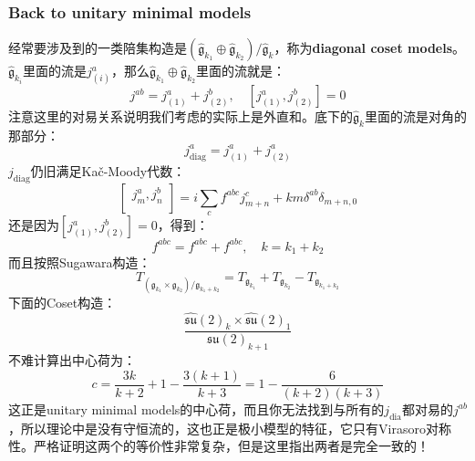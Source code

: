 \subsubsection{Back to unitary minimal models}
经常要涉及到的一类陪集构造是$(\hat{\mathfrak{g}}_{k_1}\oplus\hat{\mathfrak{g}}_{k_2})/\hat{\mathfrak{g}}_k$，称为\textbf{diagonal coset models}。$\hat{\mathfrak{g}}_{k_i}$里面的流是$j^a_{(i)}$，那么$\hat{\mathfrak{g}}_{k_1}\oplus\hat{\mathfrak{g}}_{k_2}$里面的流就是：
\begin{equation}
	j^{ab}=j_{(1)}^a+j_{(2)}^b,\quad [j_{(1)}^a,j_{(2)}^b]=0
\end{equation}
注意这里的对易关系说明我们考虑的实际上是外直和。底下的$\hat{\mathfrak{g}}_k$里面的流是对角的那部分：
\begin{equation}
	j_{\mathrm{diag}}^a=j_{(1)}^a+j_{(2)}^a
\end{equation}
$j_{\mathrm{diag}}$仍旧满足Ka\v{c}-Moody代数：
\begin{equation}
	\left.\left[\begin{array}{c}j_m^a,j_n^b\\\end{array}\right.\right]=i\sum_cf^{abc}j_{m+n}^c+km\delta^{ab}\delta_{m+n,0}
\end{equation}
还是因为$[j_{(1)}^a,j_{(2)}^b]=0$，得到：
\begin{equation}
	f^{abc}=f^{abc}+f^{abc},\quad k=k_1+k_2
\end{equation}
而且按照Sugawara构造：
\begin{equation}
	T_{(\mathfrak{g}_{k_1}\times\mathfrak{g}_{k_2})/\mathfrak{g}_{k_1+k_2}}=T_{\mathfrak{g}_{k_1}}+T_{\mathfrak{g}_{k_2}}-T_{\mathfrak{g}_{k_1+k_2}}
\end{equation}
下面的Coset构造：
\begin{equation}\label{coset}
	\frac{\widehat{\mathfrak{su}}(2)_k\times\widehat{\mathfrak{su}}(2)_1}{\mathfrak{su}(2)_{k+1}}
\end{equation}
不难计算出中心荷为：
\begin{equation}
	c=\frac{3k}{k+2}+1-\frac{3\left(k+1\right)}{k+3}=1-\frac6{(k+2)(k+3)}
\end{equation}
这正是unitary minimal models的中心荷，而且你无法找到与所有的$j_{\mathrm{dia}}$都对易的$j^{ab}$，所以理论中是没有守恒流的，这也正是极小模型的特征，它只有Virasoro对称性。严格证明这两个的等价性非常复杂，但是这里指出两者是完全一致的！
